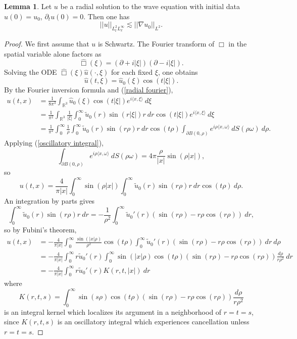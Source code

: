 \documentclass[10pt]{article}
\newcommand{\RR}{\mathbb{R}}
\theoremstyle{definition}
\newtheorem{lemma}{Lemma}[exer]
\begin{document}
\begin{lemma}
Let $u$ be a radial solution to the wave equation with initial data $u(0) = u_0$, $\partial_t u(0) = 0$. Then one has
$$||u||_{L^2_tL^\infty_x} \lesssim ||\nabla u_0||_{L^2}.$$
\end{lemma}
\begin{proof}
We first assume that $u$ is Schwartz.
The Fourier transform of $\Box$ in the spatial variable alone factors as
$$\hat \Box(\xi) = (\partial + i|\xi|)(\partial - i|\xi|).$$
Solving the ODE $\hat \Box(\xi) \hat u(\cdot, \xi)$ for each fixed $\xi$, one obtains
$$\hat u(t, \xi) = \hat u_0(\xi) \cos(t|\xi|).$$
By the Fourier inversion formula and (\ref{radial fourier}),
\begin{align*}
u(t, x) &= \frac{1}{8\pi^3} \int_{\RR^3} \hat u_0(\xi) \cos(t|\xi|) e^{i\langle x, \xi\rangle} ~d\xi\\
&= \frac{1}{\pi^2} \int_{\RR^3} \frac{1}{|\xi|} \int_0^\infty \tilde u_0(r) \sin(r|\xi|) r~dr \cos(t|\xi|)  e^{i\langle x, \xi\rangle} ~d\xi\\
&= \frac{1}{\pi^2} \int_0^\infty \frac{1}{\rho} \int_0^\infty \tilde u_0(r) \sin(r\rho) r~dr \cos(t\rho) \int_{\partial B(0, \rho)} e^{i\rho\langle x,\omega\rangle} ~dS(\rho\omega) ~d\rho.
\end{align*}
Applying (\ref{oscillatory integral}),
$$\int_{\partial B(0, \rho)} e^{i\rho\langle x, \omega\rangle} ~dS(\rho\omega) = 4\pi \frac{\rho}{|x|} \sin(\rho|x|),$$
so
$$u(t,x) = \frac{4}{\pi|x|} \int_0^\infty \sin(\rho|x|) \int_0^\infty \tilde u_0(r)\sin(r\rho)r~dr \cos(t\rho) ~d\rho.$$
An integration by parts gives
$$\int_0^\infty \tilde u_0(r) \sin(r\rho) r~dr = -\frac{1}{\rho^2} \int_0^\infty \tilde u_0'(r) (\sin(r\rho) - r\rho \cos(r\rho)) ~dr,$$
so by Fubini's theorem,
\begin{align*}
u(t, x) &= -\frac{4}{\pi |x|} \int_0^\infty \frac{\sin(|x|\rho)}{\rho^2} \cos(t\rho) \int_0^\infty \tilde u_0'(r) (\sin(r\rho) - r\rho \cos(r\rho)) ~dr~d\rho\\
&= -\frac{4}{\pi |x|} \int_0^\infty r \tilde u_0'(r) \int_0^\infty \sin(|x|\rho) \cos(t\rho) (\sin(r\rho) - r\rho \cos(r\rho)) \frac{d\rho}{r\rho^2} ~dr\\
&= -\frac{4}{\pi|x|} \int_0^\infty r \tilde u_0'(r) K(r, t, |x|) ~dr
\end{align*}
where
$$K(r, t, s) = \int_0^\infty \sin(s\rho) \cos(t\rho) (\sin(r\rho) - r\rho \cos(r\rho)) \frac{d\rho}{r\rho^2}$$
is an integral kernel which localizes its argument in a neighborhood of $r = t = s$, since $K(r, t, s)$ is an oscillatory integral which experiences cancellation unless $r = t = s$.


\end{proof}
\end{document}
